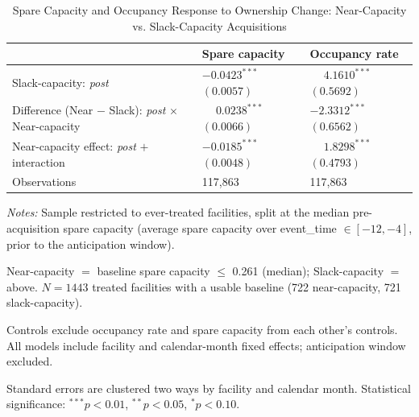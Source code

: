 \documentclass[12pt]{article}
\begin{document}
\begin{table}[H]
\centering
\begin{threeparttable}
\caption{Spare Capacity and Occupancy Response to Ownership Change: Near-Capacity vs. Slack-Capacity Acquisitions}
\label{tab:spare-capacity-near-vs-slack-transposed}
\small
\setlength{\tabcolsep}{6pt}
\begin{tabularx}{\textwidth}{@{} l Y Y @{}}
\toprule
 & \textbf{Spare capacity} & \textbf{Occupancy rate} \\
\midrule
Slack-capacity: \textit{post} &  &  \\
Difference (Near $-$ Slack): \textit{post} $\times$ Near-capacity &  &  \\
Near-capacity effect: \textit{post} $+$ interaction &  &  \\
\midrule
Observations & 117,863 & 117,863 \\
\bottomrule
\end{tabularx}
\begin{tablenotes}[flushleft]
\footnotesize
\item \textit{Notes:} Sample restricted to ever-treated facilities, split at the median pre-acquisition spare capacity (average spare capacity over event\_time $\in [-12,-4]$, prior to the anticipation window).
\item Near-capacity $=$ baseline spare capacity $\leq$ 0.261 (median); Slack-capacity $=$ above. $N = 1443$ treated facilities with a usable baseline (722 near-capacity, 721 slack-capacity).
\item Controls exclude occupancy rate and spare capacity from each other's controls. All models include facility and calendar-month fixed effects; anticipation window excluded.
\item Standard errors are clustered two ways by facility and calendar month. Statistical significance: $^{***}p<0.01$, $^{**}p<0.05$, $^{*}p<0.10$.
\end{tablenotes}
\end{threeparttable}
\end{table}
\end{document}

